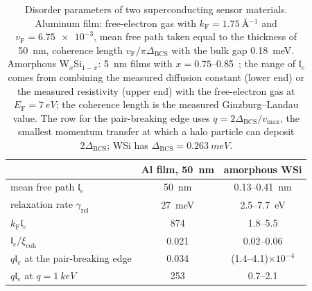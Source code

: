 \begin{table}[tbp]
  \centering
  \caption{Disorder parameters of two superconducting sensor materials. Aluminum film: free-electron gas with $k_{\mathrm{F}} = \SI{1.75}{\angstrom^{-1}}$ and $v_{\mathrm{F}} = \num{6.75e-3}$, mean free path taken equal to the thickness of \SI{50}{nm}, coherence length $v_{\mathrm{F}}/\pi\Delta_{\mathrm{BCS}}$ with the bulk gap \SI{0.18}{meV}. Amorphous W$_x$Si$_{1-x}$: \SI{5}{nm} films with $x = 0.75$--0.85~\cite[Table~I]{zhang2016characteristics}; the range of $\mathfrak{l}_e$ comes from combining the measured diffusion constant (lower end) or the measured resistivity (upper end) with the free-electron gas at $E_{\mathrm{F}} = \SI{7}{eV}$; the coherence length is the measured Ginzburg--Landau value. The row for the pair-breaking edge uses $q = 2\Delta_{\mathrm{BCS}}/v_{\mathrm{max}}$, the smallest momentum transfer at which a halo particle can deposit $2\Delta_{\mathrm{BCS}}$; WSi has $\Delta_{\mathrm{BCS}} = \SI{0.263}{meV}$.}
  \label{tab:15-disorder}
  \begin{tabular}{@{}lcc@{}}
    \toprule
    & Al film, \SI{50}{nm} & amorphous WSi \\
    \midrule
    mean free path $\mathfrak{l}_e$ & \SI{50}{nm} & 0.13--\SI{0.41}{nm} \\
    relaxation rate $\gamma_{\mathrm{rel}}$ & \SI{27}{meV} & 2.5--\SI{7.7}{eV} \\
    $k_{\mathrm{F}}\mathfrak{l}_e$ & 874 & 1.8--5.5 \\
    $\mathfrak{l}_e/\xi_{\mathrm{coh}}$ & 0.021 & 0.02--0.06 \\
    $q\mathfrak{l}_e$ at the pair-breaking edge & 0.034 & (1.4--4.1)$\times10^{-4}$ \\
    $q\mathfrak{l}_e$ at $q = \SI{1}{keV}$ & 253 & 0.7--2.1 \\
    \bottomrule
  \end{tabular}
\end{table}

